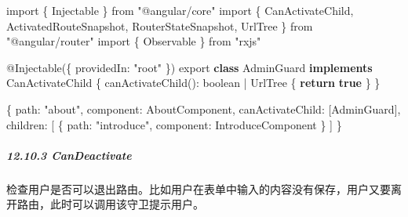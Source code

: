 \documentclass[
]{article}
\newenvironment{Shaded}{}{}
\newcommand{\ControlFlowTok}[1]{\textcolor[rgb]{0.00,0.44,0.13}{\textbf{#1}}}
\newcommand{\DataTypeTok}[1]{\textcolor[rgb]{0.56,0.13,0.00}{#1}}
\newcommand{\FunctionTok}[1]{\textcolor[rgb]{0.02,0.16,0.49}{#1}}
\newcommand{\ImportTok}[1]{#1}
\newcommand{\KeywordTok}[1]{\textcolor[rgb]{0.00,0.44,0.13}{\textbf{#1}}}
\newcommand{\NormalTok}[1]{#1}
\newcommand{\OperatorTok}[1]{\textcolor[rgb]{0.40,0.40,0.40}{#1}}
\newcommand{\StringTok}[1]{\textcolor[rgb]{0.25,0.44,0.63}{#1}}
\begin{document}
\begin{Shaded}
\begin{Highlighting}[]
\ImportTok{import}\NormalTok{ \{ Injectable \} }\ImportTok{from} \StringTok{"@angular/core"}
\ImportTok{import}\NormalTok{ \{ CanActivateChild}\OperatorTok{,}\NormalTok{ ActivatedRouteSnapshot}\OperatorTok{,}\NormalTok{ RouterStateSnapshot}\OperatorTok{,}\NormalTok{ UrlTree \} }\ImportTok{from} \StringTok{"@angular/router"}
\ImportTok{import}\NormalTok{ \{ Observable \} }\ImportTok{from} \StringTok{"rxjs"}

\NormalTok{@}\FunctionTok{Injectable}\NormalTok{(\{}
  \DataTypeTok{providedIn}\OperatorTok{:} \StringTok{"root"}
\NormalTok{\})}
\ImportTok{export} \KeywordTok{class}\NormalTok{ AdminGuard }\KeywordTok{implements}\NormalTok{ CanActivateChild \{}
  \FunctionTok{canActivateChild}\NormalTok{()}\OperatorTok{:}\NormalTok{ boolean }\OperatorTok{|}\NormalTok{ UrlTree \{}
    \ControlFlowTok{return} \KeywordTok{true}
\NormalTok{  \}}
\NormalTok{\}}
\end{Highlighting}
\end{Shaded}

\begin{Shaded}
\begin{Highlighting}[]
\NormalTok{\{}
  \DataTypeTok{path}\OperatorTok{:} \StringTok{"about"}\OperatorTok{,}
  \DataTypeTok{component}\OperatorTok{:}\NormalTok{ AboutComponent}\OperatorTok{,}
  \DataTypeTok{canActivateChild}\OperatorTok{:}\NormalTok{ [AdminGuard]}\OperatorTok{,}
  \DataTypeTok{children}\OperatorTok{:}\NormalTok{ [}
\NormalTok{    \{}
      \DataTypeTok{path}\OperatorTok{:} \StringTok{"introduce"}\OperatorTok{,}
      \DataTypeTok{component}\OperatorTok{:}\NormalTok{ IntroduceComponent}
\NormalTok{    \}}
\NormalTok{  ]}
\NormalTok{\}}
\end{Highlighting}
\end{Shaded}

\hypertarget{12103-candeactivate}{%
\subparagraph{12.10.3 CanDeactivate}\label{12103-candeactivate}}

检查用户是否可以退出路由。比如用户在表单中输入的内容没有保存，用户又要离开路由，此时可以调用该守卫提示用户。
\end{document}
